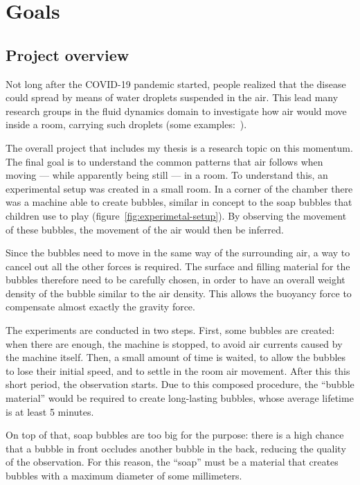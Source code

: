\chapter{Goals}
\label{chap:goal}

\section{Project overview}

Not long after the COVID-19 pandemic started, people realized that the disease could spread by means of water droplets suspended in the air.
This lead many research groups in the fluid dynamics domain to investigate how air would move inside a room, carrying such droplets (some examples:~\cite{covid-air-1}\cite{covid-air-2}).

The overall project that includes my thesis is a research topic on this momentum.
The final goal is to understand the common patterns that air follows when moving --- while apparently being still --- in a room.
To understand this, an experimental setup was created in a small room.
In a corner of the chamber there was a machine able to create bubbles, similar in concept to the soap bubbles that children use to play (figure~\ref{fig:experimetal-setup}). By observing the movement of these bubbles, the movement of the air would then be inferred.

Since the bubbles need to move in the same way of the surrounding air, a way to cancel out all the other forces is required.
The surface and filling material for the bubbles therefore need to be carefully chosen, in order to have an overall weight density of the bubble similar to the air density.
This allows the buoyancy force to compensate almost exactly the gravity force.

The experiments are conducted in two steps.
First, some bubbles are created: when there are enough, the machine is stopped, to avoid air currents caused by the machine itself.
Then, a small amount of time is waited, to allow the bubbles to lose their initial speed, and to settle in the room air movement.
After this this short period, the observation starts.
Due to this composed procedure, the ``bubble material'' would be required to create long-lasting bubbles, whose average lifetime is at least 5 minutes.

On top of that, soap bubbles are too big for the purpose: there is a high chance that a bubble in front occludes another bubble in the back, reducing the quality of the observation.
For this reason, the ``soap'' must be a material that creates bubbles with a maximum diameter of some millimeters.

